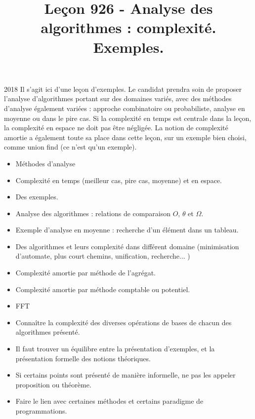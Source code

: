 \documentclass{agregfiche}
\title{Leçon 926 - Analyse des algorithmes : complexité. Exemples.}
\begin{document}
\maketitle

\secrapports
\begin{rapport}{2018}
    Il s’agit ici d’une leçon d’exemples. Le candidat prendra soin de proposer l’analyse d’algorithmes portant
    sur des domaines variés, avec des méthodes d’analyse également variées : approche combinatoire ou
    probabiliste, analyse en moyenne ou dans le pire cas.
    Si la complexité en temps est centrale dans la leçon, la complexité en espace ne doit pas être négligée.
    La notion de complexité amortie a également toute sa place dans cette leçon, sur un exemple bien
    choisi, comme union find (ce n’est qu’un exemple).
\end{rapport}

\secindispensables

\begin{itemize}
	\item Méthodes d'analyse
    \item Complexité en temps (meilleur cas, pire cas, moyenne) et en espace.
    \item Des exemples.
\end{itemize}

\secasavoir

\begin{itemize}
	\item Analyse des algorithmes : relations de comparaison $O$, $\theta$ et $\Omega$.
    \item Exemple d’analyse en moyenne : recherche d’un élément dans un tableau.
    \item Des algorithmes et leurs complexité dans différent domaine (minimisation d'automate, plus court chemins, unification, recherche... )
    	\item Complexité amortie par méthode de l'agrégat.
\end{itemize}

\secidees

\begin{itemize}
    	\item Complexité amortie par méthode comptable ou potentiel.
        \item FFT
\end{itemize}

\secpieges

\begin{itemize}
	\item Connaître la complexité des diverses opérations de bases de chacun des algorithmes présenté.
    \item Il faut trouver un équilibre entre la présentation d'exemples, et la présentation formelle des notions théoriques.
    \item Si certains points sont présenté de manière informelle, ne pas les appeler proposition ou théorème.
    \item Faire le lien avec certaines méthodes et certains paradigme de programmations.
\end{itemize}
\end{document}
